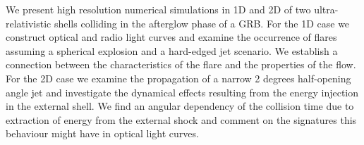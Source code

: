 


\bigskip



\bigskip

\noindent We present high resolution numerical simulations in 1D and 2D of two ultra-relativistic shells colliding in the afterglow phase of a GRB. For the 1D case we construct optical and radio light curves and examine the occurrence of flares assuming a spherical explosion and a hard-edged jet scenario. We establish a connection between the characteristics of the flare and the properties of the flow. For the 2D case we examine the propagation of a narrow 2 degrees half-opening angle jet and investigate the dynamical effects resulting from the energy injection in the external shell. We find an angular dependency of the collision time due to extraction of energy from the external shock and comment on the signatures this behaviour might have in optical light curves.

